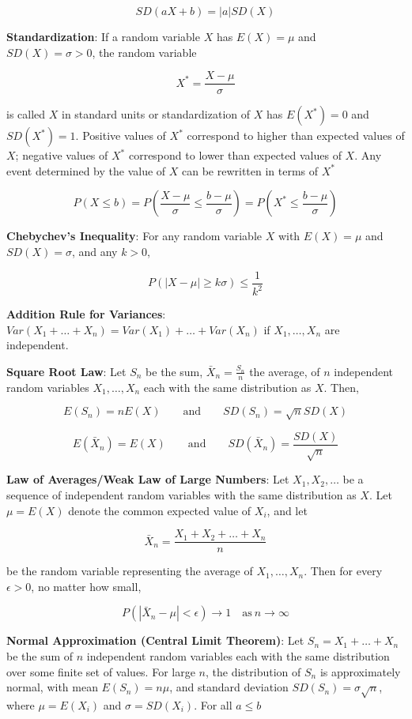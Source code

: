\documentclass{article}
\begin{document}
$$SD(aX+b)=|a|SD(X)$$

\noindent\textbf{\color{blue}Standardization}: If a random variable $X$ has $E(X)=\mu$ and $SD(X)=\sigma>0$, the random variable

$$X^*=\frac{X-\mu}{\sigma}$$
 
is called $X$ in standard units or standardization of $X$ has $E(X^*)=0$ and $SD(X^*)=1$. Positive values of $X^*$ correspond to higher than expected values of $X$; negative values of $X^*$ correspond to lower than expected values of $X$. Any event determined by the value of $X$ can be rewritten in terms of $X^*$
 
$$P(X\le b)=P(\frac{X-\mu}{\sigma}\le\frac{b-\mu}{\sigma})=P(X^*\le\frac{b-\mu}{\sigma})$$
 
\noindent\textbf{\color{red}Chebychev's Inequality}: For any random variable $X$ with $E(X)=\mu$ and $SD(X)=\sigma$, and any $k>0$,

$$P(|X-\mu|\ge k\sigma)\le\frac{1}{k^2}$$

\noindent\textbf{\color{red}Addition Rule for Variances}:$Var(X_1+\ldots+X_n)=Var(X_1)+\ldots+Var(X_n)$ if $X_1,\ldots,X_n$ are independent.

\noindent\textbf{\color{red}Square Root Law}: Let $S_n$ be the sum, $\bar{X}_n=\frac{S_n}{n}$ the average, of $n$ independent random variables $X_1,\ldots,X_n$ each with the same distribution as $X$. Then,

$$E(S_n)=nE(X)\qquad\text{and}\qquad SD(S_n)=\sqrt{n}SD(X)$$

$$E(\bar{X}_n)=E(X)\qquad\text{and}\qquad SD(\bar{X}_n)=\frac{SD(X)}{\sqrt{n}}$$
 
\noindent\textbf{\color{red}Law of Averages/Weak Law of Large Numbers}: Let $X_1,X_2,\ldots$ be a sequence of independent random variables with the same distribution as $X$. Let $\mu=E(X)$ denote the common expected value of $X_i$, and let

$$\bar{X}_n=\frac{X_1+X_2+\ldots+X_n}{n}$$

be the random variable representing the average of $X_1,\ldots,X_n$. Then for every $\epsilon>0$, no matter how small,

$$P(|\bar{X}_n-\mu|<\epsilon)\rightarrow1\quad\text{as}\ n\rightarrow\infty$$

\noindent\textbf{\color{red}Normal Approximation (Central Limit Theorem)}: Let $S_n=X_1+\ldots+X_n$ be the sum of $n$ independent random variables each with the same distribution over some finite set of values. For large $n$, the distribution of $S_n$ is approximately normal, with mean $E(S_n)=n\mu$, and standard deviation $SD(S_n)=\sigma\sqrt{n}$, where $\mu=E(X_i)$ and $\sigma=SD(X_i)$. For all $a\le b$
\end{document}
